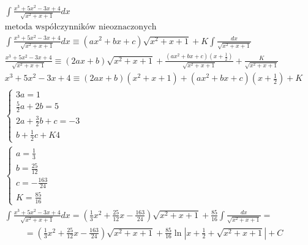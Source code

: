 \begin{gather*}
  \int \frac{x^3+5x^2-3x+4}{\sqrt{x^2+x+1}}dx \\
  \text{metoda współczynników nieoznaczonych} \\
  \int \frac{x^3+5x^2-3x+4}{\sqrt{x^2+x+1}}dx \equiv (ax^2+bx+c)\sqrt{x^2+x+1} + K\int \frac{dx}{\sqrt{x^2+x+1}} \\
\frac{x^3+5x^2-3x+4}{\sqrt{x^2+x+1}} \equiv (2ax+b)\sqrt{x^2+x+1} + \frac{(ax^2+bx+c)(x+\frac{1}{2})}{\sqrt{x^2+x+1}}+ \frac{K}{\sqrt{x^2+x+1}} \\
x^3+5x^2-3x+4 \equiv (2ax+b)(x^2+x+1) + (ax^2+bx+c)(x+\frac{1}{2})+ K \\
\begin{cases} 3a=1 \\ \frac{5}{2}a+2b=5 \\ 2a+\frac{3}{2}b+c=-3 \\ b+\frac{1}{2}c+K4 \end{cases} \\
\begin{cases} a=\frac{1}{3} \\ b=\frac{25}{12} \\ c=-\frac{163}{24} \\ K=\frac{85}{16} \end{cases} \\
\int \frac{x^3+5x^2-3x+4}{\sqrt{x^2+x+1}}dx = (\frac{1}{3}x^2+\frac{25}{12}x-\frac{163}{24})\sqrt{x^2+x+1} + \frac{85}{16}\int \frac{dx}{\sqrt{x^2+x+1}} = \end{gather*}
\begin{gather*}= (\frac{1}{3}x^2+\frac{25}{12}x-\frac{163}{24})\sqrt{x^2+x+1} + \frac{85}{16}\ln|x+\frac{1}{2}+\sqrt{x^2+x+1}|+C\end{gather*}



